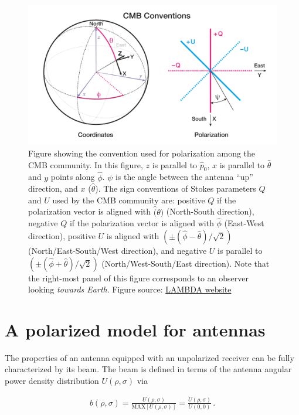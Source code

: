 \documentclass[a4paper,11pt]{article}
\begin{document}
\begin{figure}
	\centering
	\includegraphics[width=0.7\linewidth]{figures/cmb_coord_convention}
	\caption{Figure showing the convention used for polarization among the CMB community. In this figure, $z$ is parallel to $\hat{p}_0$, $x$ is parallel to $\hat{\theta}$ and $y$ points along $\hat{\phi}$. $\psi$ is the angle between the antenna ``up'' direction, and $x$ ($\hat{\theta}$). The sign conventions of Stokes parameters $Q$ and $U$ used by the CMB community are: positive $Q$ if the polarization vector is aligned with $\hat(\theta)$ (North-South direction), negative $Q$ if the polarization vector is aligned with $\hat{\phi}$ (East-West direction), positive $U$ is aligned with $(\pm(\hat{\phi} - \hat{\theta})/\sqrt{2} )$ (North/East-South/West direction), and negative $U$ is parallel to $(\pm(\hat{\phi} + \hat{\theta})/\sqrt{2} )$ (North/West-South/East direction). Note that the right-most panel of this figure corresponds to an observer looking \textsl{towards Earth}. Figure source: \href{https://lambda.gsfc.nasa.gov/product/about/pol_convention.cfm}{LAMBDA website}}
	\label{fig::cmbcoordconvention}
\end{figure}

\section{A polarized model for antennas}
\label{sec::antennas}

The properties of an antenna equipped with an unpolarized receiver can be fully characterized by its beam. The beam is defined in terms of the antenna angular power density distribution $U(\rho,\sigma)$ via

\begin{equation}
\begin{aligned}
b(\rho, \sigma) = \frac{ U(\rho, \sigma) }{ \mathrm{MAX}\left[ U(\rho,\sigma) \right] }  =  \frac{ U(\rho, \sigma) }{ U(0,0) } \, .
\end{aligned}
\label{eq::beam_def}
\end{equation}
\end{document}
